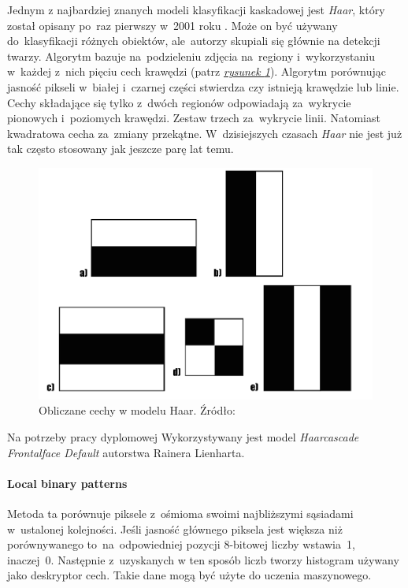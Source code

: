 Jednym z najbardziej znanych modeli klasyfikacji kaskadowej jest \textit{Haar}, który został opisany po~raz pierwszy w~2001 roku \cite{haar_proceeding}. Może on być używany do~klasyfikacji różnych obiektów, ale~autorzy skupiali się głównie na detekcji twarzy. Algorytm \cite{haar_towards} \cite{haar_pyimage} \cite{OBUKHOV2011517} bazuje na~podzieleniu zdjęcia na~regiony i~wykorzystaniu w~każdej z~nich pięciu cech krawędzi (patrz \hyperref[{fig:haar_features}]{\textit{rysunek \ref{fig:haar_features}}}). Algorytm porównując jasność pikseli w~białej i~czarnej części stwierdza czy istnieją krawędzie lub linie. Cechy składające się tylko z~dwóch regionów odpowiadają za~wykrycie pionowych i~poziomych krawędzi. Zestaw trzech za~wykrycie linii. Natomiast kwadratowa cecha za~zmiany przekątne. W~dzisiejszych czasach \textit{Haar} nie jest już tak często stosowany jak jeszcze parę lat temu.

\begin{figure}[!h]
    \begin{center}
        \includegraphics[scale=0.2]{img/face_section/haar_features.png}
        \caption{Obliczane cechy w modelu Haar. Źródło: \cite{haar_towards}}
        \label{fig:haar_features}
    \end{center}
\end{figure}

Na potrzeby pracy dyplomowej Wykorzystywany jest model \textit{Haarcascade Frontalface Default} \cite{haar_frontal} autorstwa Rainera Lienharta.



\paragraph{Local binary patterns}
Metoda ta porównuje piksele z~ośmioma swoimi najbliższymi sąsiadami w~ustalonej kolejności. Jeśli jasność głównego piksela jest większa niż porównywanego to~na~odpowiedniej pozycji 8-bitowej liczby wstawia~1, inaczej~0. Następnie z~uzyskanych w ten sposób liczb tworzy histogram używany jako deskryptor cech. Takie dane mogą być użyte do uczenia maszynowego. \cite{comp_haar_lbp}


